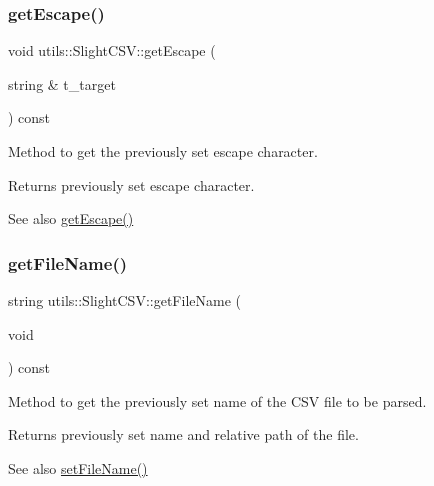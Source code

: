 \subsubsection{\texorpdfstring{get\+Escape()}{getEscape()}}
{\footnotesize\ttfamily void utils\+::\+Slight\+C\+S\+V\+::get\+Escape (\begin{DoxyParamCaption}\item[{string \&}]{t\+\_\+target }\end{DoxyParamCaption}) const}

Method to get the previously set escape character. \begin{DoxyReturn}{Returns}
previously set escape character. 
\end{DoxyReturn}
\begin{DoxySeeAlso}{See also}
\hyperlink{classutils_1_1SlightCSV_aca0cbc1e472dbe7b7a774d6add7c482f}{get\+Escape()} 
\end{DoxySeeAlso}
\mbox{\label{classutils_1_1SlightCSV_ad689937346e0d6dd37597e7c3458e164}} 
\subsubsection{\texorpdfstring{get\+File\+Name()}{getFileName()}}
{\footnotesize\ttfamily string utils\+::\+Slight\+C\+S\+V\+::get\+File\+Name (\begin{DoxyParamCaption}\item[{void}]{ }\end{DoxyParamCaption}) const}

Method to get the previously set name of the C\+SV file to be parsed. \begin{DoxyReturn}{Returns}
previously set name and relative path of the file. 
\end{DoxyReturn}
\begin{DoxySeeAlso}{See also}
\hyperlink{classutils_1_1SlightCSV_aba4b71a4a4bfa2317985a1a9cd53fc85}{set\+File\+Name()} 
\end{DoxySeeAlso}
\mbox{\label{classutils_1_1SlightCSV_a781ae99927f2b8d704add6a2a53e0051}} 
